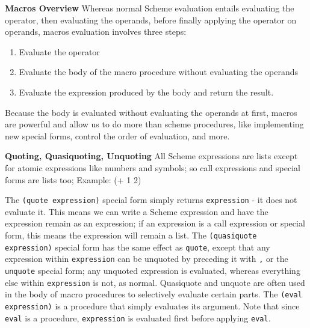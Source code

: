 \textbf{Macros Overview} Whereas normal Scheme evaluation entails evaluating the operator, then evaluating the operands, before finally applying the operator on operands, macros evaluation involves three steps:

\begin{enumerate}
\item Evaluate the operator
\item Evaluate the body of the macro procedure without evaluating the operands
\item Evaluate the expression produced by the body and return the result.
\end{enumerate}

Because the body is evaluated without evaluating the operands at first, macros are powerful and allow us to do more than scheme procedures, like implementing new special forms, control the order of evaluation, and more.

\textbf{Quoting, Quasiquoting, Unquoting} All Scheme expressions are lists except for atomic expressions like numbers and symbols; so call expressions and special forms are lists too; Example: (+ 1 2)

The \texttt{(quote expression)} special form simply returns \texttt{expression} - it does not evaluate it. This means we can write a Scheme expression and have the expression remain as an expression; if an expression is a call expression or special form, this means the expression will remain a list.
The \texttt{(quasiquote expression)} special form has the same effect as \texttt{quote}, except that any expression within \texttt{expression} can be unquoted by preceding it with \texttt{,} or the \texttt{unquote} special form; any unquoted expression is evaluated, whereas everything else within \texttt{expression} is not, as normal. Quasiquote and unquote are often used in the body of macro procedures to selectively evaluate certain parts.
The \texttt{(eval expression)} is a procedure that simply evaluates its argument. Note that since \texttt{eval} is a procedure, \texttt{expression} is evaluated first before applying \texttt{eval}.
